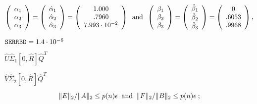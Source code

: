 {\newpage\clearpage
{}%
\begin{displaymath}
\left( \begin{array}{c} \alpha_1 \\\alpha_2 \\\alpha_3 \end{array} \right) =
\left( \begin{array}{c} \hat{\alpha}_1 \\\hat{\alpha}_2 \\\hat{\alpha}_3 \end{array} \right) =
\left( \begin{array}{c} 1.000 \\.7960 \\7.993 \cdot 10^{-2} \end{array} \right) 
\; \; {\rm and} \; \;
\left( \begin{array}{c} \beta_1 \\\beta_2 \\\beta_3 \end{array} \right) =
\left( \begin{array}{c} \hat{\beta}_1 \\\hat{\beta}_2 \\\hat{\beta}_3 \end{array} \right) =
\left( \begin{array}{c} 0 \\.6053 \\.9968 \end{array} \right) ,
\end{displaymath}%
\lthtmldisplayZ
\lthtmlcheckvsize\clearpage}

{\newpage\clearpage
{}%
${\tt SERRBD} = 1.4 \cdot 10^{-6}$%
\lthtmlinlinemathZ
\lthtmlcheckvsize\clearpage}

{\newpage\clearpage
{}%
$\hat{U} \hat{\Sigma}_1 [0,\hat{R}] \hat{Q}^T$%
\lthtmlinlinemathZ
\lthtmlcheckvsize\clearpage}

{\newpage\clearpage
{}%
$\hat{V} \hat{\Sigma}_2 [0,\hat{R}] \hat{Q}^T$%
\lthtmlinlinemathZ
\lthtmlcheckvsize\clearpage}

{\newpage\clearpage
{}%
\begin{displaymath}
\|E\|_2 / \|A\|_2 \leq p(n) \epsilon \; \; {\rm and} \; \;
\|F\|_2 / \|B\|_2 \leq p(n) \epsilon  \; ;
\end{displaymath}%
\lthtmldisplayZ
\lthtmlcheckvsize\clearpage}

